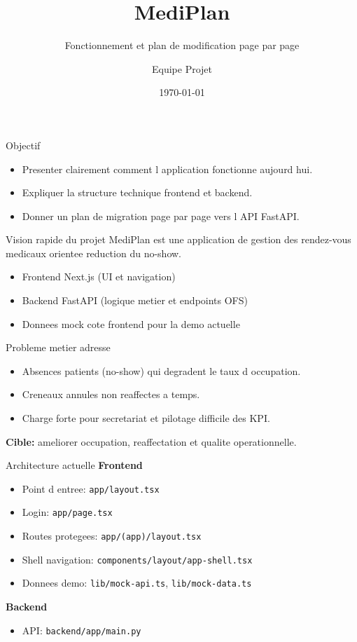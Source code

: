 \documentclass[10pt,aspectratio=169]{beamer}
\title{MediPlan}
\subtitle{Fonctionnement et plan de modification page par page}
\author{Equipe Projet}
\date{\today}
\begin{document}
\begin{frame}
  \titlepage
\end{frame}

\begin{frame}{Objectif}
  \begin{itemize}
    \item Presenter clairement comment l application fonctionne aujourd hui.
    \item Expliquer la structure technique frontend et backend.
    \item Donner un plan de migration page par page vers l API FastAPI.
  \end{itemize}
\end{frame}

\begin{frame}{Vision rapide du projet}
  MediPlan est une application de gestion des rendez-vous medicaux orientee reduction du no-show.
  \vspace{0.4cm}
  \begin{itemize}
    \item Frontend Next.js (UI et navigation)
    \item Backend FastAPI (logique metier et endpoints OFS)
    \item Donnees mock cote frontend pour la demo actuelle
  \end{itemize}
\end{frame}

\begin{frame}{Probleme metier adresse}
  \begin{itemize}
    \item Absences patients (no-show) qui degradent le taux d occupation.
    \item Creneaux annules non reaffectes a temps.
    \item Charge forte pour secretariat et pilotage difficile des KPI.
  \end{itemize}
  \vspace{0.3cm}
  \textbf{Cible:} ameliorer occupation, reaffectation et qualite operationnelle.
\end{frame}

\begin{frame}{Architecture actuelle}
  \textbf{Frontend}
  \begin{itemize}
    \item Point d entree: \texttt{app/layout.tsx}
    \item Login: \texttt{app/page.tsx}
    \item Routes protegees: \texttt{app/(app)/layout.tsx}
    \item Shell navigation: \texttt{components/layout/app-shell.tsx}
    \item Donnees demo: \texttt{lib/mock-api.ts}, \texttt{lib/mock-data.ts}
  \end{itemize}
  \vspace{0.2cm}
  \textbf{Backend}
  \begin{itemize}
    \item API: \texttt{backend/app/main.py}
  \end{itemize}
\end{frame}
\end{document}

